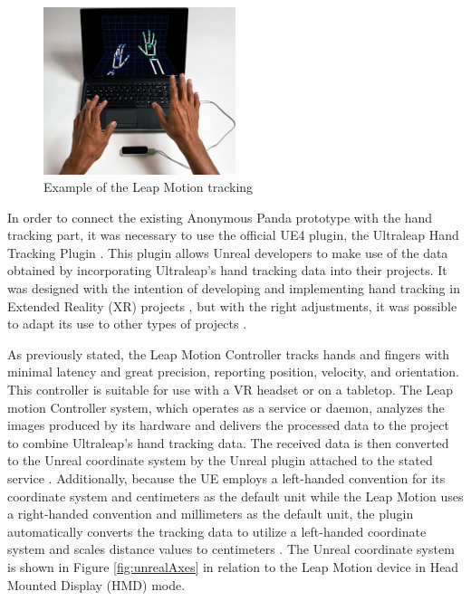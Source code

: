 \begin{figure}[!htb]
\includegraphics[width=0.5\textwidth]{figures/leapMotion.jpg}
\centering
\caption{Example of the Leap Motion tracking \cite{LEAPROD}}
\label{fig:exampleLeap}
\end{figure}

In order to connect the existing Anonymous Panda prototype with the hand tracking part, it was necessary to use the official UE4 plugin, the Ultraleap Hand Tracking Plugin \cite{ULT}. This plugin allows Unreal developers to make use of the data obtained by incorporating Ultraleap's hand tracking data into their projects. It was designed with the intention of developing and implementing hand tracking in Extended Reality (XR) projects \cite{XR}, but with the right adjustments, it was possible to adapt its use to other types of projects \cite{ULTG}.

As previously stated, the Leap Motion Controller tracks hands and fingers with minimal latency and great precision, reporting position, velocity, and orientation. This controller is suitable for use with a VR headset or on a tabletop. The Leap motion Controller system, which operates as a service or daemon, analyzes the images produced by its hardware and delivers the processed data to the project to combine Ultraleap's hand tracking data. The received data is then converted to the Unreal coordinate system by the Unreal plugin attached to the stated service \cite{ULTP}. Additionally, because the UE employs a left-handed convention for its coordinate system and centimeters as the default unit while the Leap Motion uses a right-handed convention and millimeters as the default unit, the plugin automatically converts the tracking data to utilize a left-handed coordinate system and scales distance values to centimeters \cite{ULTP}. The Unreal coordinate system is shown in Figure \ref{fig:unrealAxes} in relation to the Leap Motion device in Head Mounted Display (HMD) mode.

